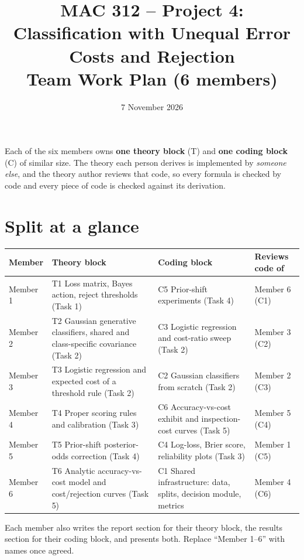 \documentclass[11pt,a4paper]{article}
\title{\textbf{MAC 312 -- Project 4: Classification with Unequal Error Costs and Rejection}\\[2pt]\large Team Work Plan (6 members)}
\date{7 November 2026}
\begin{document}
\maketitle

\noindent Each of the six members owns \textbf{one theory block} (T) and \textbf{one coding block} (C) of similar size.
The theory each person derives is implemented by \emph{someone else}, and the theory author reviews that code,
so every formula is checked by code and every piece of code is checked against its derivation.

\section{Split at a glance}

\begin{center}
\small
\begin{tabularx}{\textwidth}{@{}l L L l@{}}
\toprule
\textbf{Member} & \textbf{Theory block} & \textbf{Coding block} & \textbf{Reviews code of} \\
\midrule
Member 1 & T1 Loss matrix, Bayes action, reject thresholds (Task 1) & C5 Prior-shift experiments (Task 4) & Member 6 (C1) \\
Member 2 & T2 Gaussian generative classifiers, shared and class-specific covariance (Task 2) & C3 Logistic regression and cost-ratio sweep (Task 2) & Member 3 (C2) \\
Member 3 & T3 Logistic regression and expected cost of a threshold rule (Task 2) & C2 Gaussian classifiers from scratch (Task 2) & Member 2 (C3) \\
Member 4 & T4 Proper scoring rules and calibration (Task 3) & C6 Accuracy-vs-cost exhibit and inspection-cost curves (Task 5) & Member 5 (C4) \\
Member 5 & T5 Prior-shift posterior-odds correction (Task 4) & C4 Log-loss, Brier score, reliability plots (Task 3) & Member 1 (C5) \\
Member 6 & T6 Analytic accuracy-vs-cost model and cost/rejection curves (Task 5) & C1 Shared infrastructure: data, splits, decision module, metrics & Member 4 (C6) \\
\bottomrule
\end{tabularx}
\end{center}

Each member also writes the report section for their theory block, the results section for their coding block,
and presents both. Replace ``Member 1--6'' with names once agreed.
\end{document}
